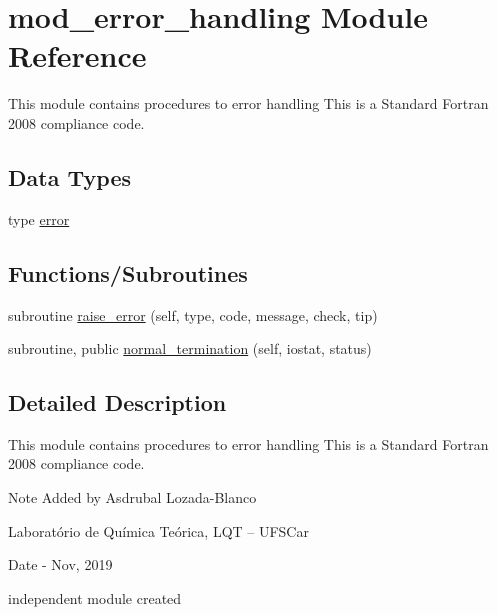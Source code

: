 \hypertarget{namespacemod__error__handling}{}\section{mod\+\_\+error\+\_\+handling Module Reference}
\label{namespacemod__error__handling}


This module contains procedures to error handling This is a Standard Fortran 2008 compliance code.  


\subsection*{Data Types}
\begin{DoxyCompactItemize}
\item 
type \hyperlink{structmod__error__handling_1_1error}{error}
\end{DoxyCompactItemize}
\subsection*{Functions/\+Subroutines}
\begin{DoxyCompactItemize}
\item 
subroutine \hyperlink{namespacemod__error__handling_a93bd5f43a4db84dd187231ce58493d0a}{raise\+\_\+error} (self, type, code, message, check, tip)
\item 
subroutine, public \hyperlink{namespacemod__error__handling_a54366620ef058729af93f4bc7d507df7}{normal\+\_\+termination} (self, iostat, status)
\end{DoxyCompactItemize}


\subsection{Detailed Description}
This module contains procedures to error handling This is a Standard Fortran 2008 compliance code. 

\begin{DoxyNote}{Note}
Added by Asdrubal Lozada-\/\+Blanco
\begin{DoxyItemize}
\item Laboratório de Química Teórica, L\+QT -- U\+F\+S\+Car 
\end{DoxyItemize}
\end{DoxyNote}
\begin{DoxyDate}{Date}
-\/ Nov, 2019
\begin{DoxyItemize}
\item independent module created 
\end{DoxyItemize}
\end{DoxyDate}


